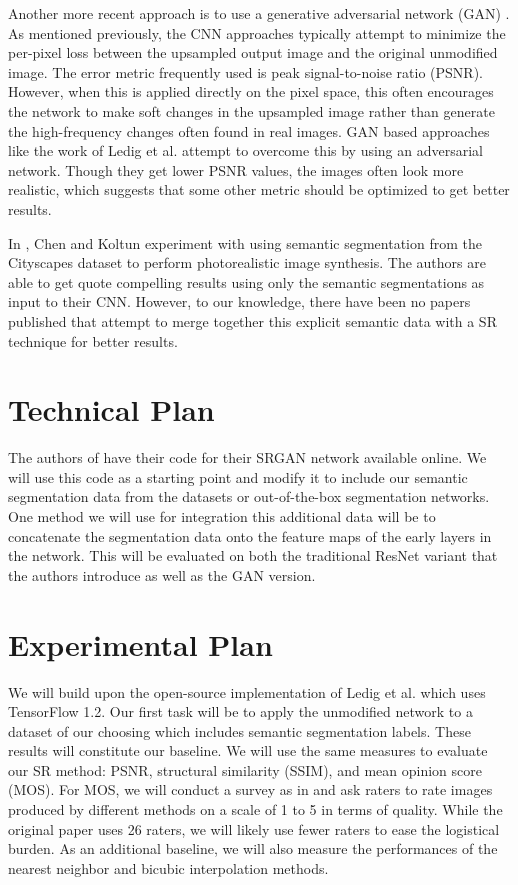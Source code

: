\documentclass[10pt,twocolumn,letterpaper]{article}
\begin{document}
Another more recent approach is to use a generative adversarial network (GAN)
\cite{GAN}. As mentioned previously, the CNN approaches typically attempt to
minimize the per-pixel loss between the upsampled output image and the original
unmodified image. The error metric frequently used is peak signal-to-noise
ratio (PSNR). However, when this is applied directly on the pixel space, this
often encourages the network to make soft changes in the upsampled image rather
than generate the high-frequency changes often found in real images. GAN based
approaches like the work of Ledig et al. \cite{SRGAN} attempt to overcome this
by using an adversarial network. Though they get lower PSNR values, the images
often look more realistic, which suggests that some other metric should be
optimized to get better results.

In \cite{ImageSynthesis}, Chen and Koltun experiment with using semantic
segmentation from the Cityscapes dataset \cite{Cityscapes} to perform
photorealistic image synthesis. The authors are able to get quote compelling
results using only the semantic segmentations as input to their CNN. However,
to our knowledge, there have been no papers published that attempt to merge
together this explicit semantic data with a SR technique for better results.


\section{Technical Plan}
The authors of \cite{SRGAN} have their code for their SRGAN network available
online. We will use this code as a starting point and modify it to include our
semantic segmentation data from the datasets or out-of-the-box segmentation
networks. One method we will use for integration this additional data will be
to concatenate the segmentation data onto the feature maps of the early layers
in the network. This will be evaluated on both the traditional ResNet variant
that the authors introduce as well as the GAN version.  


\section{Experimental Plan}
We will build upon the open-source implementation of Ledig et al. \cite{SRGAN}
which uses TensorFlow 1.2. Our first task will be to apply the unmodified
network to a dataset of our choosing which includes semantic segmentation
labels. These results will constitute our baseline. We will use the same
measures to evaluate our SR method: PSNR, structural similarity (SSIM), and
mean opinion score (MOS). For MOS, we will conduct a survey as in \cite{SRGAN}
and ask raters to rate images produced by different methods on a scale of 1 to
5 in terms of quality. While the original paper uses 26 raters, we will likely
use fewer raters to ease the logistical burden. As an additional baseline, we
will also measure the performances of the nearest neighbor and bicubic
interpolation methods.
\end{document}
